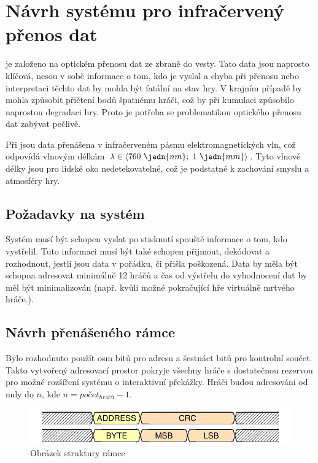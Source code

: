 \chapter{Návrh systému pro infračervený přenos dat}
 je založeno na optickém přenosu dat ze zbraně do vesty. Tato data jsou naprosto klíčová, nesou v sobě informace o tom, kdo je vyslal a chyba při přenosu nebo interpretaci těchto dat by mohla být fatální na stav hry. V krajním případě by mohla způsobit přičtení bodů špatnému hráči, což by při kumulaci způsobilo naprostou degradaci hry. Proto je potřeba se problematikou optického přenosu dat zabývat pečlivě.

Při  jsou data přenášena v infračerveném pásmu elektromagnetických vln, což odpovídá vlnovým délkám $\lambda \in \langle 760~\jedn{nm};~1~\jedn{mm}\rangle$. Tyto vlnové délky jsou pro lidské oko nedetekovatelné, což je podstatné k zachování smyslu a atmosféry hry.

\section{Požadavky na systém}
Systém musí být schopen vyslat po stisknutí spouště informace o tom, kdo vystřelil. Tuto informaci musí být také schopen přijmout, dekódovat a rozhodnout, jestli jsou data v pořádku, či přišla poškozená. Data by měla být schopna adresovat minimálně 12 hráčů a čas od výstřelu do vyhodnocení dat by měl být minimalizován (např. kvůli možné pokračující hře virtuálně mrtvého hráče.).

\section{Návrh přenášeného rámce}
Bylo rozhodnuto použít osm bitů pro adresu a šestnáct bitů pro kontrolní součet. Takto vytvořený adresovací prostor pokryje všechny hráče s dostatečnou rezervou pro možné rozšíření systému o interaktivní překážky. Hráči budou adresováni od nuly do $n$, kde $n = počet _{hráčů} - 1$.

\begin{figure}[H]
    \begin{center}
        \includegraphics[width=\textwidth]{img/ir-packet}
    \end{center}
    \caption{Obrázek struktury rámce}
\end{figure}

